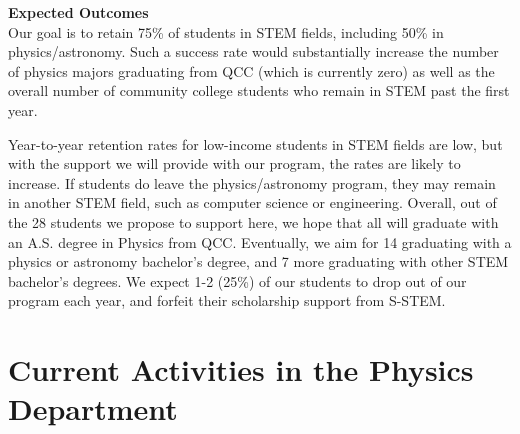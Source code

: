\documentclass[12pt]{article}
\newcommand\reword[1]{{\color{red}#1}}
\begin{document}
\noindent
{\bf Expected Outcomes}\\
\noindent
Our goal is to retain 75\% of students in STEM fields, including 50\% in physics/astronomy.  Such a success rate would substantially increase the number of physics majors graduating from QCC (which is currently zero) as well as the overall number of community college students who remain in STEM past the first year.  


Year-to-year retention rates for low-income students in STEM fields are low, but with the support we will provide with our program, the rates are likely to increase.  If students do leave the physics/astronomy program, they may remain in another STEM field, such as computer science or engineering.  Overall, out of the 28 students we propose to support here, we hope that all will graduate with an A.S. degree in Physics from QCC.  Eventually, we aim for 14 graduating with a physics or astronomy bachelor's degree, and 7 more graduating with other STEM bachelor's degrees.  We expect 1-2 (25\%) of our students to drop out of our program each year, and forfeit their scholarship support from S-STEM.
\vspace{-5mm}


\section{\large{Current Activities in the Physics Department}}
\vspace{-3mm}
\end{document}
